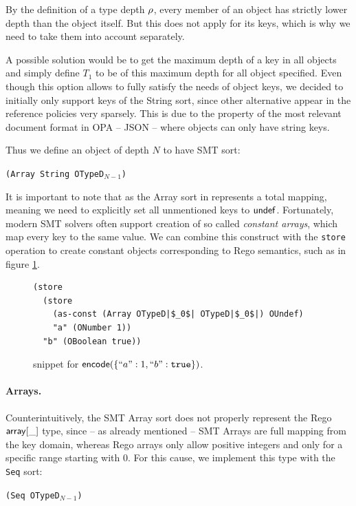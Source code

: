By the definition of a type depth $\rho$, every member of an object has strictly lower depth than the object itself.
But this does not apply for its keys, which is why we need to take them into account separately.

A possible solution would be to get the maximum depth of a key in all objects and simply define $T_1$ to be of this maximum depth for all object specified.
Even though this option allows to fully satisfy the needs of object keys, we decided to initially only support keys of the String sort, since other alternative appear in the reference policies very sparsely.
This is due to the property of the most relevant document format in OPA -- JSON -- where objects can only have string keys.

Thus we define an object of depth $N$ to have SMT sort:
\begin{center}
  \texttt{(Array String OTypeD$_{N-1}$)}
\end{center}

It is important to note that as the Array sort in \smtlib represents a total mapping, meaning we need to explicitly set all unmentioned keys to $\mathsf{undef}$.
Fortunately, modern SMT solvers often support creation of so called \emph{constant arrays}, which map every key to the same value.
We can combine this construct with the \texttt{store} operation to create constant objects corresponding to Rego semantics, such as in figure \ref{f:cons-obj}.

\begin{figure}
  \label{f:cons-obj}
  \caption{\smtlib snippet for $\mathsf{encode}(\{``a": 1, ``b": \texttt{true}\})$.}
\begin{lstlisting}[language=SMT,escapechar=|]
(store
  (store
    (as-const (Array OTypeD|$_0$| OTypeD|$_0$|) OUndef)
    "a" (ONumber 1))
  "b" (OBoolean true))
\end{lstlisting}
\end{figure}

\paragraph{Arrays.}
Counterintuitively, the SMT Array sort does not properly represent the Rego $\mathsf{array}[{\_}]$ type, since -- as already mentioned -- SMT Arrays are full mapping from the key domain, whereas Rego arrays only allow positive integers and only for a specific range starting with $0$.
For this cause, we implement this type with the \texttt{Seq} sort:
\begin{center}
  \texttt{(Seq OTypeD$_{N-1}$)}
\end{center}

